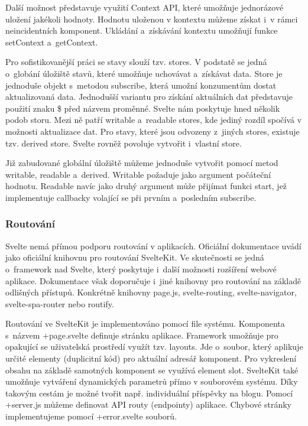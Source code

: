 Další možnost představuje využití Context API, které umožňuje jednorázové uložení jakékoli hodnoty. 
Hodnotu uloženou v kontextu můžeme získat i~v rámci neincidentních komponent. Ukládání a~získávání kontextu umožňují funkce setContext a~getContext.

Pro sofistikovanější práci se stavy slouží tzv. stores. V podstatě se jedná o~globání úložiště stavů, které umožňuje uchovávat a~získávat data. 
Store je jednoduše objekt s~metodou subscribe, která umožní konzumentům dostat aktualizovaná data. 
Jednodušší variantu pro získání aktuálních dat představuje použití znaku \$ před názvem proměnné. Svelte nám poskytuje hned několik podob storu. 
Mezi ně patří writable a~readable stores, kde jediný rozdíl spočívá v možnosti aktualizace dat. 
Pro stavy, které jsou odvozeny z~jiných stores, existuje tzv. derived store. Svelte rovněž povoluje vytvořit i~vlastní store. 

Již zabudované globální úložiště můžeme jednoduše vytvořit pomocí metod writable, readable a~derived. Writable požaduje jako argument počáteční hodnotu. 
Readable navíc jako druhý argument může přijímat funkci start, jež implementuje callbacky volající se při prvním a~posledním subscribe.\cite{sveltehandbook,svelte,sveltestatemanagement}

\subsubsection{Routování}

Svelte nemá přímou podporu routování v aplikacích. Oficiální dokumentace uvádí jako oficiální knihovnu pro routování SvelteKit. 
Ve skutečnosti se jedná o~framework nad Svelte, který poskytuje i~další možnosti rozšíření webové aplikace. 
Dokumentace však doporučuje i~jiné knihovny pro routování na základě odlišných přístupů. 
Konkrétně knihovny page.js, svelte-routing, svelte-navigator, svelte-spa-router nebo routify.\cite{svelte,svelteforbeginners}

Routování ve SvelteKit je implementováno pomocí file systému. Komponenta s~názvem +page.svelte definuje stránku aplikace. 
Framework umožňuje pro opakující se uživatelská prostředí využít tzv. layouts. Jde o~soubor, který aplikuje určité elementy (duplicitní kód) pro aktuální adresář komponent. 
Pro vykreslení obsahu na základě samotných komponent se využívá element slot. SvelteKit také umožňuje vytváření dynamických parametrů přímo v souborovém systému. 
Díky takovým cestám je možné tvořit např. individuální příspěvky na blogu. Pomocí +server.js můžeme definovat API routy (endpointy) aplikace. 
Chybové stránky implementujeme pomocí +error.svelte souborů.\cite{svelte,sveltekit}

